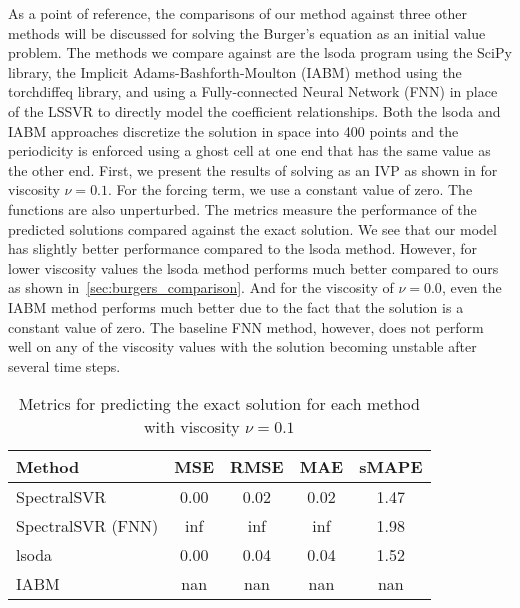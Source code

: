\documentclass[preprint,12pt,times,authoryear]{elsarticle}
\begin{document}
\noindent As a point of reference, the comparisons of our method against three other methods will be discussed for solving the Burger's equation as an initial value problem. The methods we compare against are the lsoda program using the SciPy library, the Implicit Adams-Bashforth-Moulton (IABM) method using the torchdiffeq library, and using a Fully-connected Neural Network (FNN) in place of the LSSVR to directly model the coefficient relationships. Both the lsoda and IABM approaches discretize the solution in space into 400 points and the periodicity is enforced using a ghost cell at one end that has the same value as the other end. First, we present the results of solving  as an IVP as shown in  for viscosity \(\nu=0.1\). For the forcing term, we use a constant value of zero. The functions are also unperturbed. The metrics measure the performance of the predicted solutions compared against the exact solution. We see that our model has slightly better performance compared to the lsoda method. However, for lower viscosity values the lsoda method performs much better compared to ours as shown in~\ref{sec:burgers_comparison}. And for the viscosity of \(\nu=0.0\), even the IABM method performs much better due to the fact that the solution is a constant value of zero. The baseline FNN method, however, does not perform well on any of the viscosity values with the solution becoming unstable after several time steps.
\begin{table}[H]
  \caption{Metrics for predicting the exact solution for each method with viscosity \(\nu=0.1\)}\label{table:comparison_exact_metrics_0.1}
  \centering
  \begin{tabular}{lcccc}
    \toprule
    Method            & MSE  & RMSE & MAE  & sMAPE \\
    \midrule

    SpectralSVR       & 0.00 & 0.02 & 0.02 & 1.47  \\
    SpectralSVR (FNN) & inf  & inf  & inf  & 1.98  \\
    lsoda             & 0.00 & 0.04 & 0.04 & 1.52  \\
    IABM              & nan  & nan  & nan  & nan   \\
    \bottomrule
  \end{tabular}
\end{table}
\end{document}
